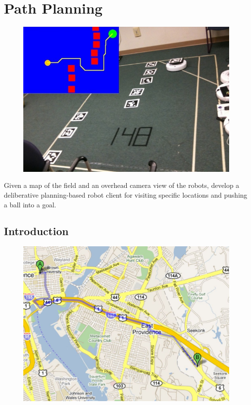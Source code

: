 
\chapter{Path Planning}
\label{sec:path_planning}

\begin{figure}[!h]
\centering
\includegraphics[width=1.0\columnwidth]{figures/7_teaser.jpg}
\end{figure}

\newpage


Given a map of the field and an overhead camera view of the robots, develop a deliberative planning-based robot client for visiting specific locations and pushing a ball into a goal.

\section{Introduction}

\begin{figure}
\includegraphics[width=0.35\columnwidth]{figures/7_googlemaps.jpg}
\end{figure}

